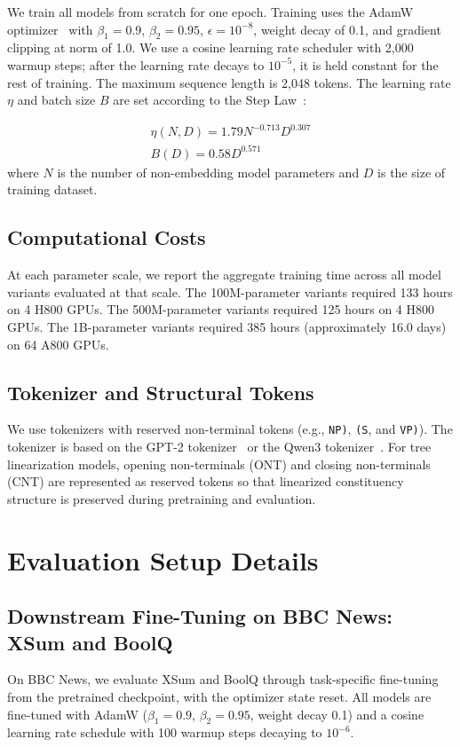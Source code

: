 \documentclass[11pt]{article}
\begin{document}
We train all models from scratch for one epoch. Training uses the AdamW optimizer~\cite{loshchilov2017decoupledADAM} with $\beta_1{=}0.9$, $\beta_2{=}0.95$, $\epsilon{=}10^{-8}$, weight decay of 0.1, and gradient clipping at norm of 1.0. We use a cosine learning rate scheduler with 2,000 warmup steps; after the learning rate decays to $10^{-5}$, it is held constant for the rest of training. The maximum sequence length is 2,048 tokens. The learning rate $\eta$ and batch size $B$ are set according to the Step Law~\cite{li2025predictable}:

\begin{equation}
    \begin{gathered}
       \eta(N,D) = 1.79N^{-0.713}D^{0.307} \\
B(D) = 0.58D^{0.571}
    \end{gathered}
\label{eq:steplaw}
\end{equation}
where $N$ is the number of non-embedding model parameters and $D$ is the size of training dataset. 

\subsection{Computational Costs}
At each parameter scale, we report the aggregate training time across all model variants evaluated at that scale.
The 100M-parameter variants required 133 hours on 4 H800 GPUs.
The 500M-parameter variants required 125 hours on 4 H800 GPUs.
The 1B-parameter variants required 385 hours (approximately 16.0 days) on 64 A800 GPUs.

\subsection{Tokenizer and Structural Tokens}
We use tokenizers with reserved non-terminal tokens (e.g., \texttt{NP)}, \texttt{(S}, and \texttt{VP)}).
The tokenizer is based on the GPT-2 tokenizer~\cite{radford2019language} or the Qwen3 tokenizer~\cite{yang2025qwen3}.
For tree linearization models, opening non-terminals (ONT) and closing non-terminals (CNT) are represented as reserved tokens so that linearized constituency structure is preserved during pretraining and evaluation.

\section{Evaluation Setup Details}

\subsection{Downstream Fine-Tuning on BBC News: XSum and BoolQ}
On BBC News, we evaluate XSum and BoolQ through task-specific fine-tuning from the pretrained checkpoint, with the optimizer state reset.
All models are fine-tuned with AdamW ($\beta_1{=}0.9$, $\beta_2{=}0.95$, weight decay 0.1) and a cosine learning rate schedule with 100 warmup steps decaying to $10^{-6}$.
\end{document}

